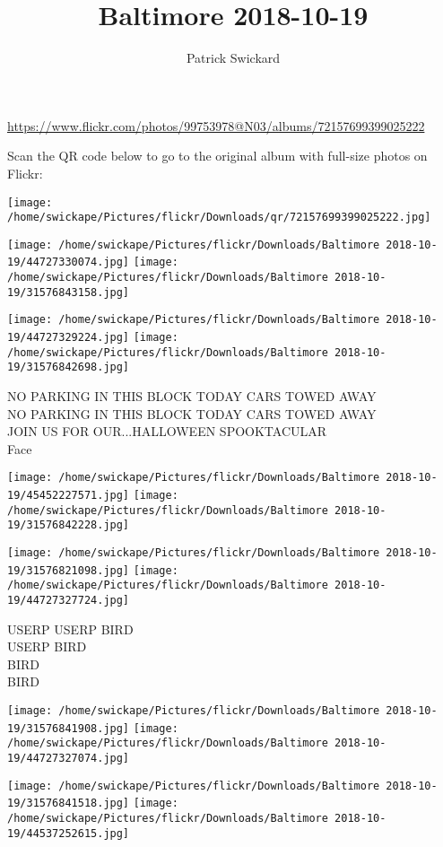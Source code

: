\documentclass[10pt,letterpaper]{article}
\title{Baltimore 2018-10-19}
\author{Patrick Swickard}
\date{}
\begin{document}
\maketitle

\url{https://www.flickr.com/photos/99753978@N03/albums/72157699399025222}

Scan the QR code below to go to the original album with full-size photos on Flickr:

\texttt{[image: /home/swickape/Pictures/flickr/Downloads/qr/72157699399025222.jpg]}
\pagebreak

\texttt{[image: /home/swickape/Pictures/flickr/Downloads/Baltimore 2018-10-19/44727330074.jpg]}
\texttt{[image: /home/swickape/Pictures/flickr/Downloads/Baltimore 2018-10-19/31576843158.jpg]}

\texttt{[image: /home/swickape/Pictures/flickr/Downloads/Baltimore 2018-10-19/44727329224.jpg]}
\texttt{[image: /home/swickape/Pictures/flickr/Downloads/Baltimore 2018-10-19/31576842698.jpg]}

NO PARKING IN THIS BLOCK TODAY CARS TOWED AWAY\\
NO PARKING IN THIS BLOCK TODAY CARS TOWED AWAY\\
JOIN US FOR OUR...HALLOWEEN SPOOKTACULAR\\
Face
\pagebreak

\texttt{[image: /home/swickape/Pictures/flickr/Downloads/Baltimore 2018-10-19/45452227571.jpg]}
\texttt{[image: /home/swickape/Pictures/flickr/Downloads/Baltimore 2018-10-19/31576842228.jpg]}

\texttt{[image: /home/swickape/Pictures/flickr/Downloads/Baltimore 2018-10-19/31576821098.jpg]}
\texttt{[image: /home/swickape/Pictures/flickr/Downloads/Baltimore 2018-10-19/44727327724.jpg]}

USERP USERP BIRD\\
USERP BIRD\\
BIRD\\
BIRD
\pagebreak

\texttt{[image: /home/swickape/Pictures/flickr/Downloads/Baltimore 2018-10-19/31576841908.jpg]}
\texttt{[image: /home/swickape/Pictures/flickr/Downloads/Baltimore 2018-10-19/44727327074.jpg]}

\texttt{[image: /home/swickape/Pictures/flickr/Downloads/Baltimore 2018-10-19/31576841518.jpg]}
\texttt{[image: /home/swickape/Pictures/flickr/Downloads/Baltimore 2018-10-19/44537252615.jpg]}
\end{document}

